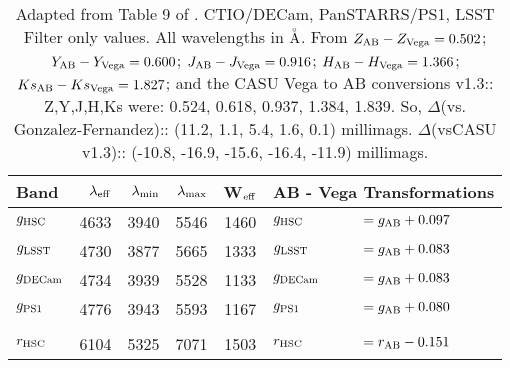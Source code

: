 \documentclass[usenatbib]{mnras}
\begin{document}
\begin{table*}
  \begin{center}
   \caption{Adapted from Table 9 of \citet{Peth2011}. 
CTIO/DECam, PanSTARRS/PS1, LSST
Filter only values. 
All wavelengths in ${\buildrel _{\circ} \over {\mathrm{A}}}$. 
From \citet{GonzalezFernandez2018} 
$Z_{\rm AB}   -  Z_{\rm Vega}  = 0.502$;  
$Y_{\rm AB}  -  Y_{\rm Vega}    = 0.600 $;
$J_{\rm AB}   -  J_{\rm Vega}    = 0.916  $;
$H_{\rm AB}  -  H_{\rm Vega}    = 1.366 $;
$Ks_{\rm AB}  -  Ks_{\rm Vega}  = 1.827 $;
and the CASU Vega to AB conversions v1.3:: 
	Z,Y,J,H,Ks were: 0.524, 0.618, 0.937, 1.384, 1.839. 
So, $\Delta$(vs. Gonzalez-Fernandez)::
	(11.2,     1.1,    5.4,     1.6,    0.1) millimags. 
$\Delta$(vsCASU v1.3)::
	(-10.8, -16.9, -15.6,  -16.4, -11.9) millimags. 
}
    \setlength{\tabcolsep}{4pt}
     \begin{tabular}{l r r r  c l l}
      \hline
      \hline
      Band & $\lambda_{\rm eff}  $ 
              &  $\lambda_{\rm min} $ 
              & $\lambda_{\rm max} $ 
              & W$_{\rm eff}$
              & \multicolumn{2}{c}{AB - Vega  Transformations} \\
      \hline
       $g_{\rm HSC}$    &  	4633   &     3940     &   5546	&  1460       &    $g_{\rm HSC}$         &$  = g_{\rm AB} + 0.097 $ \\
      $g_{\rm LSST}$      &     4730     &	  3877    &	   5665   &  1333   &  $g_{\rm LSST}$       &$ = g_{\rm AB} +  0.083 $ \\   %
      $g_{\rm DECam}$  &      4734     &   3939    &    5528   &   1133        &  $g_{\rm DECam} $    &$  = g_{\rm AB} + 0.083 $ \\	     
       $g_{\rm PS1}$        &    4776    &    3943    &    5593   &   1167        &  $g_{\rm PS1}$         &$  = g_{\rm AB} + 0.080 $ \\   %
      &&&&&&\\
      $r_{\rm HSC}$         &    6104     &   5325    &   7071	&   1503       & $r_{\rm HSC}   $       &$     = r_{\rm AB} - 0.151 $ \\

\end{tabular}
\end{center}
\end{table*}
\end{document}
